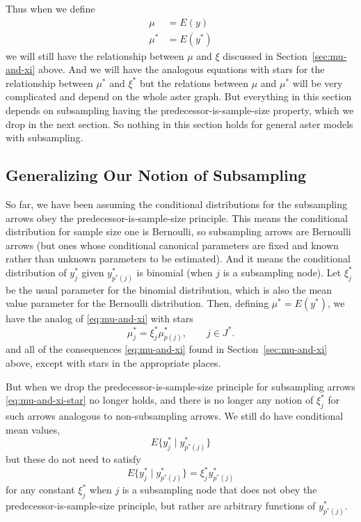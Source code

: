 Thus when we define
\begin{align*}
   \mu & = E(y)
   \\
   \mu^* & = E(y^*)
\end{align*}
we will still have the relationship between $\mu$ and $\xi$ discussed
in Section~\ref{sec:mu-and-xi} above.
And we will have the analogous equations with stars for the relationship
between $\mu^*$ and $\xi^*$ but the relations between $\mu$ and $\mu^*$
will be very complicated and depend on the whole aster graph.
But everything in this section depends on subsampling having the
predecessor-is-sample-size property, which we drop in the next section.
So nothing in this section holds for general aster models with subsampling.

\subsection{Generalizing Our Notion of Subsampling} \label{sec:generalize}

So far, we have been assuming the conditional distributions for the
subsampling arrows obey the predecessor-is-sample-size principle.  This
means the conditional distribution for sample size one is Bernoulli,
so subsampling arrows are Bernoulli arrows (but ones whose conditional
canonical parameters are fixed and known rather than unknown parameters
to be estimated).  And it means the conditional distribution of $y_j^*$
given $y_{p^*(j)}^*$ is binomial (when $j$ is a subsampling node).
Let $\xi_j^*$ be the usual parameter for the binomial distribution,
which is also the mean value parameter for the Bernoulli distribution.
Then, defining $\mu^* = E(y^*)$, we have
the analog of \eqref{eq:mu-and-xi} with stars
\begin{equation} \label{eq:mu-and-xi-star}
   \mu_j^* = \xi_j^* \mu_{p(j)}^*, \qquad j \in J^*.
\end{equation}
and all of the consequences \eqref{eq:mu-and-xi} found in
Section~\ref{sec:mu-and-xi} above, except with stars in the appropriate places.

But when we drop the predecessor-is-sample-size principle for subsampling
arrows \eqref{eq:mu-and-xi-star} no longer holds, and there is no longer
any notion of $\xi^*_j$ for such arrows analogous to non-subsampling
arrows.  We still do have conditional mean values,
$$
   E\bigl\{ y_j^* \mid y_{p^*(j)}^*\bigr\}
$$
but these do not need to satisfy
$$
   E\bigl\{ y_j^* \mid y_{p^*(j)}^*\bigr\}
   =
   \xi_j^* y_{p^*(j)}^*
$$
for any constant $\xi_j^*$ when $j$ is a subsampling node that does not
obey the predecessor-is-sample-size principle, but rather are arbitrary
functions of $y_{p^*(j)}^*$.


